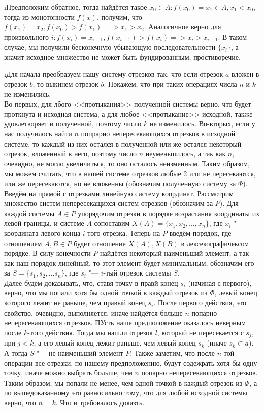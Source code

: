 \i Предположим обратное, тогда найдётся такое $x_0 \in A: f(x_0) = x_1 \in A, x_1 < x_0$, тогда из монотонности $f(x)$, получим, что $f(x_1) = x_2, f(x_0) > f(x_1) => x_1 > x_2$. Аналогичное верно для произвольного $i: f(x_i) = x_{i+1}, f(x_{i-1}) > f(x_i) => x_i > x_{i+1}$. В таком случае, мы получили бесконечную убывающую последовательности $\{x_i\}$, а значит исходное множество не может быть фундированным, простиворечие. 

\i Для начала преобразуем нашу систему отрезков так, что если отрезок $a$ вложен в отрезок $b$, то выкинем отрезок $b$. Покажем, что при таких операциях числа $n$ и $k$ не изменились.\\
Во-первых, для лбого <<протыкания>> полученной системы верно, что будет проткнута и исходная система, а для любое <<протыкание>> исходной, также удовлетворяет и полученной, поэтому число $k$ не изменилось. Во-вторых, если у нас получилось найти $n$ попрарно непересекающихся отрезков в исходной системе, то каждый из них остался в полученной или же остался некоторый отрезок, вложенный в него, поэтому число $n$ неуменьшилось, а так как $n$, очевидно, не могло увеличиться, то оно осталось неизменным. Таким образом, мы можем считать, что в нашей системе отрезков любые 2 или не пересекаются, или же пересекаются, но не вложенны (обозначим полученную систему за $\Phi$).\\
Введём на прямой с отрезками линейную систему координат. Рассмотрим множество систем непересекащихся систем отрезков (обозначим за $P$). Для каждой системы $A \in P$ упорядочим отрезки в порядке возрастания координаты их левой границы, и системе $A$ сопоставим $X(A) = \{x_1, x_2, \ldots, x_n\}$, где $x_i$ "--- координата левого конца $i$-того отрезка. Теперь на $P$ введём порядок, где отношением $A, B \in P$ будет отношение $X(A), X(B)$ в лексекографичексом порядке. В силу конечности $P$ найдётся некоторый наименьший элемент, а так как наш порядок линейный, то этот элемент будет минимальным, обозначим его за $S = \{s_1, s_2, \ldots s_n\}$, где $s_i$ "--- $i$-тый отрезок системы $S$.\\
Далее будем доказывать, что, ставя точку в правй конец $s_i$ (начиная с первого), верно, что мы попали хотя бы одной точкой в каждый отрезок из $\Phi$, левый конец которого лежит не раньше, чем правый конец $s_i$. После первого действия, это свойство, очевидно, выполняется, иначе найдётся больше $n$ попарно непересекающихся отрезков. ПУсть наше предположение оказалось неверным после $k$-того действия. Тогда мы нашли отрезок $l$, который не пересекается с $s_j$, при $j < k$, а его левый конец лежит раньше, чем левый конец $s_k$ (иначе $s_k \subset a$). А тогда $S$ "--- не наименьший элемент $P$. Также заметим, что после $n$-той операции все отрезки, по нашему предположению, будут содежрать хотя бы одну точку, иначе можно выбрать больше, чем $n$ попарно непересекающихся отрезков.\\
Таким образом, мы попали не менее, чем одной точкой в каждый отрезок из $\Phi$, а по вышедоказанному это равносильно тому, что для любой исходной системы верно, что $n = k$. Что и требовалось доказть.

